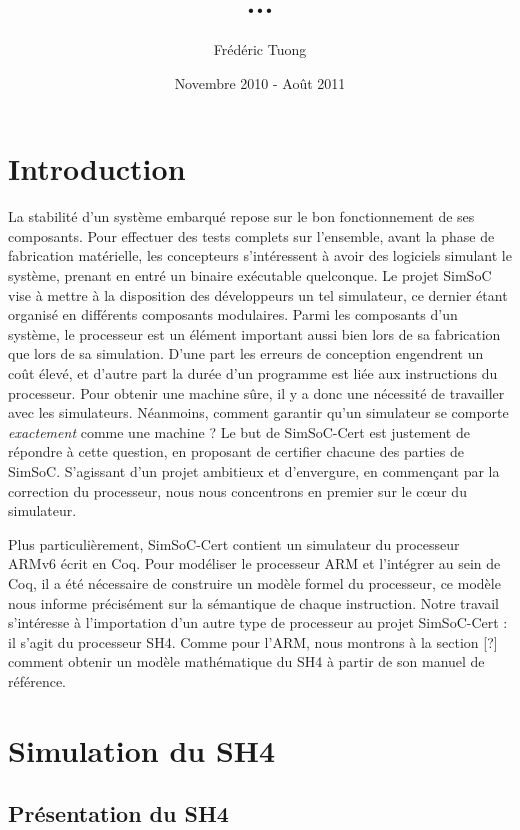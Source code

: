 \documentclass[a4paper, 11pt]{article}
\author{Frédéric Tuong}
\title{...}
\date{Novembre 2010 - Août 2011}
\begin{document}
\maketitle

\section{Introduction}
La stabilité d'un système embarqué repose sur le bon fonctionnement de ses composants. Pour effectuer des tests complets sur l'ensemble, avant la phase de fabrication matérielle, les concepteurs s'intéressent à avoir des logiciels simulant le système, prenant en entré un binaire exécutable quelconque. Le projet SimSoC vise à mettre à la disposition des développeurs un tel simulateur, ce dernier étant organisé en différents composants modulaires. Parmi les composants d'un système, le processeur est un élément important aussi bien lors de sa fabrication que lors de sa simulation. D'une part les erreurs de conception engendrent un coût élevé, et d'autre part la durée d'un programme est liée aux instructions du processeur. Pour obtenir une machine sûre, il y a donc une nécessité de travailler avec les simulateurs. Néanmoins, comment garantir qu'un simulateur se comporte \emph{exactement} comme une machine ?
Le but de SimSoC-Cert est justement de répondre à cette question, en proposant de certifier chacune des parties de SimSoC. S'agissant d'un projet ambitieux et d'envergure, en commençant par la correction du processeur, nous nous concentrons en premier sur le c\oe ur du simulateur. 

Plus particulièrement, SimSoC-Cert contient un simulateur du processeur ARMv6 écrit en Coq. Pour modéliser le processeur ARM et l'intégrer au sein de Coq, il a été nécessaire de construire un modèle formel du processeur, ce modèle nous informe précisément sur la sémantique de chaque instruction. 
Notre travail s'intéresse à l'importation d'un autre type de processeur au projet SimSoC-Cert : il s'agit du processeur SH4. Comme pour l'ARM, nous montrons à la section [?] comment obtenir un modèle mathématique du SH4 à partir de son manuel de référence.

\section{Simulation du SH4}

  \subsection{Présentation du SH4}
\end{document}
